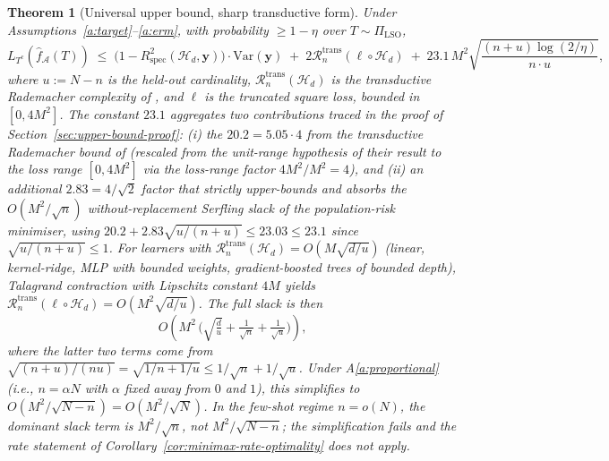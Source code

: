 \documentclass[11pt,a4paper]{article}
\theoremstyle{plain}
\newtheorem{theorem}{Theorem}
\theoremstyle{definition}
\theoremstyle{remark}
\newcommand{\by}{\mathbf{y}}
\newcommand{\Var}{\mathrm{Var}}
\newcommand{\Rspec}{R^2_{\mathrm{spec}}}
\newcommand{\Acal}{\mathcal{A}}
\newcommand{\Hcal}{\mathcal{H}}
\begin{document}
\begin{theorem}[Universal upper bound, sharp transductive form]
\label{thm:universal-upper-bound}
Under Assumptions~\ref{a:target}--\ref{a:erm}, with probability $\geq 1
- \eta$ over $T \sim \Pi_{\mathrm{LSO}}$,
\begin{equation}
    L_{T^c}(\hat f_\Acal(T))
    \;\leq\; \big(1 - \Rspec(\Hcal_d, \by)\big) \cdot \Var(\by)
        \;+\; 2 \mathcal{R}^{\mathrm{trans}}_n(\ell \circ \Hcal_d)
        \;+\; 23.1\, M^2 \sqrt{\frac{(n + u)\log(2/\eta)}{n \cdot u}},
    \label{eq:universal-upper-bound}
\end{equation}
where $u := N - n$ is the held-out cardinality,
$\mathcal{R}^{\mathrm{trans}}_n(\Hcal_d)$ is the transductive
Rademacher complexity of \citet[][\S 3]{ElYanivPechyony2006},
and $\ell$ is the truncated square loss, bounded in $[0, 4M^2]$.
The constant $23.1$ aggregates two contributions traced in the
proof of Section~\ref{sec:upper-bound-proof}: (i) the
$20.2 = 5.05 \cdot 4$ from the transductive Rademacher bound of
\citet[][Theorem~1]{ElYanivPechyony2006} (rescaled from the
unit-range hypothesis of their result to the loss range $[0, 4M^2]$
via the loss-range factor $4M^2/M^2 = 4$), and (ii) an additional
$2.83 = 4/\sqrt{2}$ factor that strictly upper-bounds and absorbs
the $O(M^2/\sqrt{n})$ without-replacement Serfling slack of the
population-risk minimiser, using
$20.2 + 2.83\sqrt{u/(n+u)} \leq 23.03 \leq 23.1$ since
$\sqrt{u/(n+u)} \leq 1$. For learners with
$\mathcal{R}^{\mathrm{trans}}_n(\Hcal_d) = O(M\sqrt{d/u})$
(linear, kernel-ridge, MLP with bounded weights, gradient-boosted
trees of bounded depth), Talagrand contraction with Lipschitz
constant $4M$ yields $\mathcal{R}^{\mathrm{trans}}_n(\ell \circ
\Hcal_d) = O(M^2\sqrt{d/u})$. The full slack is then
\[
    O\!\left(M^2\,\bigg(\sqrt{\tfrac{d}{u}} + \tfrac{1}{\sqrt n}
        + \tfrac{1}{\sqrt u}\bigg)\right),
\]
where the latter two terms come from
$\sqrt{(n+u)/(nu)} = \sqrt{1/n + 1/u} \le 1/\sqrt n + 1/\sqrt u$.
Under A\ref{a:proportional} (i.e., $n = \alpha N$ with $\alpha$
fixed away from $0$ and $1$), this simplifies to
$O(M^2/\sqrt{N - n}) = O(M^2/\sqrt N)$. In the few-shot regime
$n = o(N)$, the dominant slack term is $M^2/\sqrt n$, not
$M^2/\sqrt{N - n}$; the simplification fails and the rate
statement of Corollary~\ref{cor:minimax-rate-optimality} does
not apply.
\end{theorem}
\end{document}

